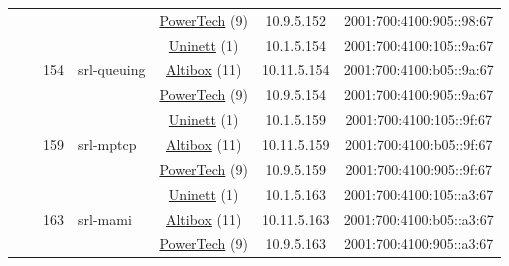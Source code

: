 \begin{small}
\begin{center}
\begin{longtable}{|c|c|c|c|c|c|c|c|}
  &  &  &  & \multicolumn{2}{|c|}{\tiny{\href{http://www.powertech.no}{PowerTech} (9)}} & \tiny{10.9.5.152} & \tiny{2001:700:4100:905::98:67} \\* \cline{3-3}\cline{4-4}\cline{5-5}\cline{6-6}\cline{7-7}\cline{8-8}
  &  & \multirow{3}{*}{\tiny{154}} & \multicolumn{1}{|l|}{\multirow{3}{*}{\tiny{srl-queuing}}} & \multicolumn{2}{|c|}{\tiny{\href{https://www.uninett.no}{Uninett} (1)}} & \tiny{10.1.5.154} & \tiny{2001:700:4100:105::9a:67} \\* \cline{5-5}\cline{6-6}\cline{7-7}\cline{8-8}
  &  &  &  & \multicolumn{2}{|c|}{\tiny{\href{https://www.altibox.no}{Altibox} (11)}} & \tiny{10.11.5.154} & \tiny{2001:700:4100:b05::9a:67} \\* \cline{5-5}\cline{6-6}\cline{7-7}\cline{8-8}
  &  &  &  & \multicolumn{2}{|c|}{\tiny{\href{http://www.powertech.no}{PowerTech} (9)}} & \tiny{10.9.5.154} & \tiny{2001:700:4100:905::9a:67} \\* \cline{3-3}\cline{4-4}\cline{5-5}\cline{6-6}\cline{7-7}\cline{8-8}
  &  & \multirow{3}{*}{\tiny{159}} & \multicolumn{1}{|l|}{\multirow{3}{*}{\tiny{srl-mptcp}}} & \multicolumn{2}{|c|}{\tiny{\href{https://www.uninett.no}{Uninett} (1)}} & \tiny{10.1.5.159} & \tiny{2001:700:4100:105::9f:67} \\* \cline{5-5}\cline{6-6}\cline{7-7}\cline{8-8}
  &  &  &  & \multicolumn{2}{|c|}{\tiny{\href{https://www.altibox.no}{Altibox} (11)}} & \tiny{10.11.5.159} & \tiny{2001:700:4100:b05::9f:67} \\* \cline{5-5}\cline{6-6}\cline{7-7}\cline{8-8}
  &  &  &  & \multicolumn{2}{|c|}{\tiny{\href{http://www.powertech.no}{PowerTech} (9)}} & \tiny{10.9.5.159} & \tiny{2001:700:4100:905::9f:67} \\* \cline{3-3}\cline{4-4}\cline{5-5}\cline{6-6}\cline{7-7}\cline{8-8}
  &  & \multirow{3}{*}{\tiny{163}} & \multicolumn{1}{|l|}{\multirow{3}{*}{\tiny{srl-mami}}} & \multicolumn{2}{|c|}{\tiny{\href{https://www.uninett.no}{Uninett} (1)}} & \tiny{10.1.5.163} & \tiny{2001:700:4100:105::a3:67} \\* \cline{5-5}\cline{6-6}\cline{7-7}\cline{8-8}
  &  &  &  & \multicolumn{2}{|c|}{\tiny{\href{https://www.altibox.no}{Altibox} (11)}} & \tiny{10.11.5.163} & \tiny{2001:700:4100:b05::a3:67} \\* \cline{5-5}\cline{6-6}\cline{7-7}\cline{8-8}
  &  &  &  & \multicolumn{2}{|c|}{\tiny{\href{http://www.powertech.no}{PowerTech} (9)}} & \tiny{10.9.5.163} & \tiny{2001:700:4100:905::a3:67} \\* \cline{3-3}\cline{4-4}\cline{5-5}\cline{6-6}\cline{7-7}\cline{8-8}

\end{longtable}
\end{center}
\end{small}
